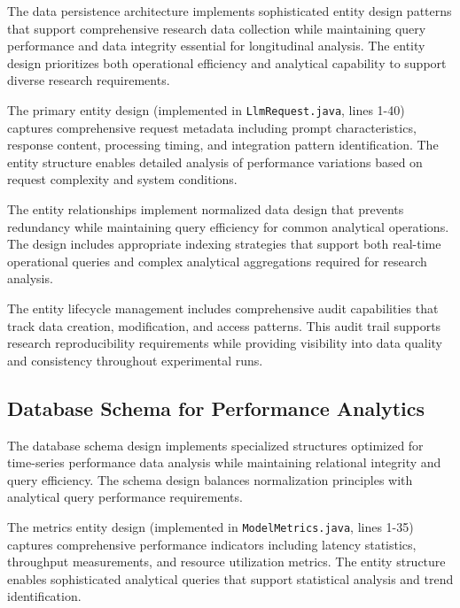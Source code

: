 The data persistence architecture implements sophisticated entity design patterns that support comprehensive research data collection while maintaining query performance and data integrity essential for longitudinal analysis. The entity design prioritizes both operational efficiency and analytical capability to support diverse research requirements.

The primary entity design (implemented in \texttt{LlmRequest.java}, lines 1-40) captures comprehensive request metadata including prompt characteristics, response content, processing timing, and integration pattern identification. The entity structure enables detailed analysis of performance variations based on request complexity and system conditions.


The entity relationships implement normalized data design that prevents redundancy while maintaining query efficiency for common analytical operations. The design includes appropriate indexing strategies that support both real-time operational queries and complex analytical aggregations required for research analysis.

The entity lifecycle management includes comprehensive audit capabilities that track data creation, modification, and access patterns. This audit trail supports research reproducibility requirements while providing visibility into data quality and consistency throughout experimental runs.

\subsection{Database Schema for Performance Analytics}

The database schema design implements specialized structures optimized for time-series performance data analysis while maintaining relational integrity and query efficiency. The schema design balances normalization principles with analytical query performance requirements.

The metrics entity design (implemented in \texttt{ModelMetrics.java}, lines 1-35) captures comprehensive performance indicators including latency statistics, throughput measurements, and resource utilization metrics. The entity structure enables sophisticated analytical queries that support statistical analysis and trend identification.



